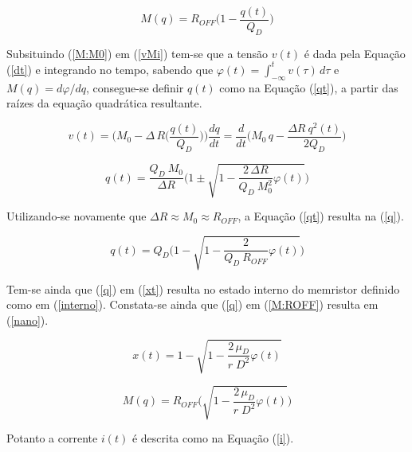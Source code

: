 \documentclass{ceel}
\begin{document}
\begin{multicols}{2}
\begin{equation}\label{M:ROFF}%
M(q)=R_{OFF}\bigg( 1-\dfrac{q(t)}{Q_D}\bigg)
\end{equation}
\vspace{0.05cm}

Subsituindo (\ref{M:M0}) em (\ref{vMi}) tem-se que a tensão $v(t)$ é dada pela Equação (\ref{dt}) e integrando no tempo, sabendo que $\varphi(t)=\int_{-\infty}^t v(\tau)\, d\tau$ e $M(q)=d\varphi/dq$,  consegue-se definir $q(t)$ como na Equação (\ref{qt}), a partir das raízes da equação quadrática resultante.

\begin{equation}\label{dt}
v(t)=\Big(M_0-\Delta \, R\Big(\dfrac{q(t)}{Q_D}\Big)\Big)\dfrac{dq}{dt} = \dfrac{d}{dt} \Big(M_0\, q-\dfrac{\Delta R\ q^2(t)}{2 Q_D}\Big)
\end{equation}

\begin{equation}\label{qt}
q(t)=\dfrac{Q_D\ M_0}{\Delta R}\Bigg(1\pm\sqrt{1-\dfrac{2\, \Delta R}{Q_D\ M^2_0}\varphi(t)}\Bigg)
\end{equation} 
\vspace{0.05cm}

Utilizando-se novamente que $\Delta R \approx M_0 \approx R_{OFF}$, a Equação (\ref{qt}) resulta na (\ref{q}).
\vspace{0.05cm}

\begin{equation}\label{q}
q(t)=Q_D\Bigg(1-\sqrt{1-\dfrac{2}{Q_D\ R_{OFF}}\varphi(t)}\Bigg)
\end{equation} 
\vspace{0.05cm}

Tem-se ainda que (\ref{q}) em (\ref{xt}) resulta no estado interno do memristor definido como em (\ref{interno}). Constata-se ainda que (\ref{q}) em (\ref{M:ROFF}) resulta em (\ref{nano}).
\vspace{0.001cm}

\begin{equation}\label{interno}
x(t)=1-\sqrt{1-\dfrac{2\, \mu_D}{r\; D^2}\varphi(t)}
\end{equation} 

\begin{equation}\label{nano}
M(q)=R_{OFF}\Bigg(\sqrt{1-\dfrac{2\, \mu_D}{r\; D^2}\varphi(t) }\Bigg)
\end{equation}
\vspace{0.05cm}

Potanto a corrente $i(t)$ é descrita como na Equação (\ref{i}).


\end{multicols}
\end{document}
